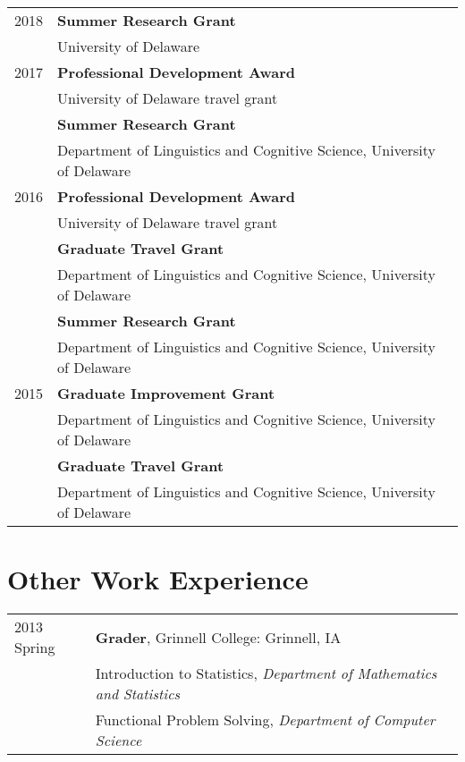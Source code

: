 \documentclass[11pt]{article} %
\begin{document}
\begin{longtable}{p{1in}  p{5.3in}}
2018 & \textbf{Summer Research Grant} \\
& University of Delaware \\ [5pt]
2017	& \textbf{Professional Development Award} \\
& University of Delaware travel grant \\ [5pt]
 & \textbf{Summer Research Grant} \\
	 & Department of Linguistics and Cognitive Science, University of Delaware \\ [5pt]
2016 & \textbf{Professional Development Award} \\
		& University of Delaware travel grant\\ [5pt]
	 & \textbf{Graduate Travel Grant} \\
	& Department of Linguistics and Cognitive Science, University of Delaware\\ [5pt]
 & \textbf{Summer Research Grant} \\
 & Department of Linguistics and Cognitive Science, University of Delaware \\ [5pt]
2015 & \textbf{Graduate Improvement Grant} \\
	& Department of Linguistics and Cognitive Science, University of Delaware \\  [5pt]
 & \textbf{Graduate Travel Grant} \\
 & Department of Linguistics and Cognitive Science, University of Delaware\\
\end{longtable}













\section*{Other Work Experience}
\begin{longtable}{p{1in} p{5.3in}}
2013 Spring & \textbf{Grader}, Grinnell College: Grinnell, IA \\
& Introduction to Statistics, \textit{Department of Mathematics and Statistics} \\
& Functional Problem Solving, \textit{Department of Computer Science} \\

\end{longtable}
\end{document}
